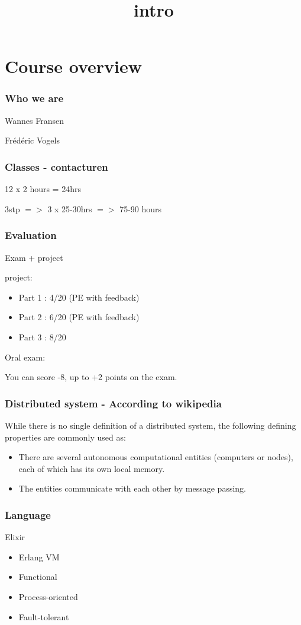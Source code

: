 \documentclass{ucll-slides}
\title{intro}
\begin{document}
\maketitle

\section{Course overview}

\begin{frame}
    \frametitle{Who we are}
    Wannes Fransen

    Frédéric Vogels
\end{frame}

\begin{frame}
    \frametitle{Classes - contacturen}
    12 x 2 hours = 24hrs 

    3stp $=>$ 3 x 25-30hrs $=>$ 75-90 hours 
\end{frame}

\begin{frame}
    \frametitle{Evaluation}
    Exam + project

    project: 
    \begin{itemize}
        \item Part 1 : 4/20 (PE with feedback)
        \item Part 2 : 6/20 (PE with feedback)
        \item Part 3 : 8/20 
    \end{itemize}

    Oral exam:

    You can score -8, up to +2 points on the exam.
\end{frame}

\begin{frame}
    \frametitle{Distributed system - According to wikipedia}

    While there is no single definition of a distributed system, the following defining properties are commonly used as:
    \begin{itemize}
        \item There are several autonomous computational entities (computers or nodes), each of which has its own local memory.
        \item The entities communicate with each other by message passing.
    \end{itemize}
    
\end{frame}

\begin{frame}
    \frametitle{Language}
    Elixir 

    \begin{itemize}
        \item Erlang VM
        \item Functional
        \item Process-oriented
        \item Fault-tolerant
    \end{itemize}
\end{frame}
\end{document}
